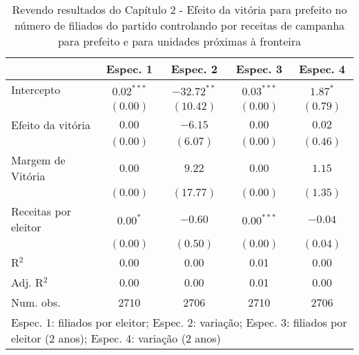 
\begin{table}
\caption{Revendo resultados do Capítulo 2 - Efeito da vitória para prefeito no número de filiados do partido controlando por receitas de campanha para prefeito e para unidades próximas à fronteira}
\begin{center}
\begin{tabular}{l c c c c }
\hline
                     & Espec. 1 & Espec. 2 & Espec. 3 & Espec. 4 \\
\hline
Intercepto           & $0.02^{***}$ & $-32.72^{**}$ & $0.03^{***}$ & $1.87^{*}$ \\
                     & $(0.00)$     & $(10.42)$     & $(0.00)$     & $(0.79)$   \\
Efeito da vitória    & $0.00$       & $-6.15$       & $0.00$       & $0.02$     \\
                     & $(0.00)$     & $(6.07)$      & $(0.00)$     & $(0.46)$   \\
Margem de Vitória    & $0.00$       & $9.22$        & $0.00$       & $1.15$     \\
                     & $(0.00)$     & $(17.77)$     & $(0.00)$     & $(1.35)$   \\
Receitas por eleitor & $0.00^{*}$   & $-0.60$       & $0.00^{***}$ & $-0.04$    \\
                     & $(0.00)$     & $(0.50)$      & $(0.00)$     & $(0.04)$   \\
\hline
R$^2$                & 0.00         & 0.00          & 0.01         & 0.00       \\
Adj. R$^2$           & 0.00         & 0.00          & 0.01         & 0.00       \\
Num. obs.            & 2710         & 2706          & 2710         & 2706       \\
\hline
\multicolumn{5}{l}{\scriptsize{Espec. 1: filiados por eleitor; Espec. 2: variação; Espec. 3: filiados por eleitor (2 anos); Espec. 4: variação (2 anos)}}
\end{tabular}
\label{tab:c4t8}
\end{center}
\end{table}

